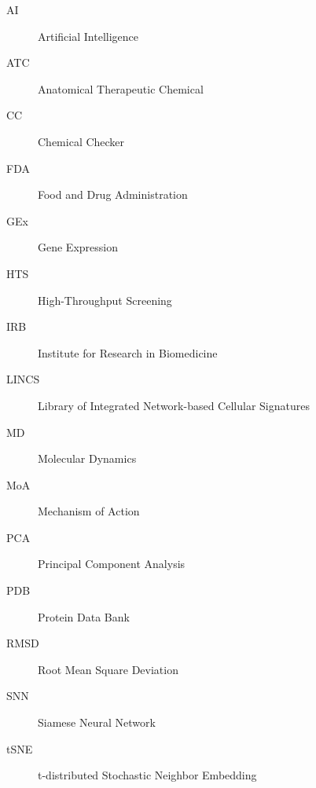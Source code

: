 

\begin{description}
    \item[AI] Artificial Intelligence
    \item[ATC] Anatomical Therapeutic Chemical
    \item[CC] Chemical Checker
    \item[FDA] Food and Drug Administration
    \item[GEx] Gene Expression
    \item[HTS] High-Throughput Screening
    \item[IRB] Institute for Research in Biomedicine 
    \item[LINCS] Library of Integrated Network-based Cellular Signatures
    \item[MD] Molecular Dynamics
    \item[MoA] Mechanism of Action
    \item[PCA] Principal Component Analysis
    \item[PDB] Protein Data Bank
    \item[RMSD] Root Mean Square Deviation 
    \item[SNN] Siamese Neural Network
    \item[tSNE] t-distributed Stochastic Neighbor Embedding
\end{description}

